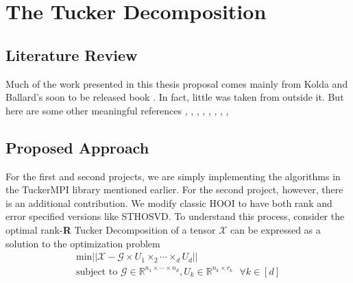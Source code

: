 \documentclass[MS]{wfuthesis}
\begin{document}
    \chapter{\textbf{The Tucker Decomposition}}
    \newpage





    \section{Literature Review}
        Much of the work presented in this thesis proposal comes mainly from Kolda and Ballard's soon to be released book \cite{Big_Boss}. In fact, little was taken from outside it. But here are some other meaningful references \cite{Tucker_Decomp_1}, \cite{Tucker_Decomp_2}, \cite{Tucker_Decomp_3}, \cite{Tucker_Decomp_4}, \cite{Tucker_Decomp_5}, \cite{Tucker_Decomp_6}, \cite{FastMatMul_1}, \cite{FastMatMul_2}, \cite{cui2024palmprobnetprobabilisticapproachunderstanding}
    \newpage




    \section{Proposed Approach} %
        For the first and second projects, we are simply implementing the algorithms in the TuckerMPI library mentioned earlier. For the second project, however, there is an additional contribution. We modify classic HOOI to have both rank and error specified versions like STHOSVD. To understand this process, consider the optimal rank-\textbf{R} Tucker Decomposition of a tensor $\mathcal{X}$ can be expressed as a solution to the optimization problem
        \begin{eqnarray*}
            \text{min} ||\mathcal{X - G} \times U_1 \times_2 \cdots \times_d U_d || \\
            \text{subject to } \mathcal{G} \in \mathbb{R}^{n_1 \times \cdots \times n_d}, U_k \in \mathbb{R}^{n_k \times r_k} \text{ } \forall k \in [d]
        \end{eqnarray*}
\end{document}
